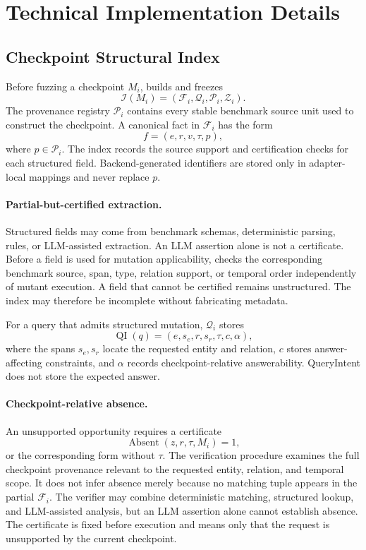 \section{Technical Implementation Details}
\label{app:tech}

\subsection{Checkpoint Structural Index}
\label{app:structural-index}

Before fuzzing a checkpoint \(M_i\), \system builds and freezes
\[
\mathcal{I}(M_i)=(\mathcal{F}_i,\mathcal{Q}_i,
\mathcal{P}_i,\mathcal{Z}_i).
\]
The provenance registry \(\mathcal{P}_i\) contains every stable benchmark
source unit used to construct the checkpoint. A canonical fact in
\(\mathcal{F}_i\) has the form
\[
f=(e,r,v,\tau,p),
\]
where \(p\in\mathcal{P}_i\). The index records the source support and
certification checks for each structured field. Backend-generated identifiers
are stored only in adapter-local mappings and never replace \(p\).

\paragraph{Partial-but-certified extraction.}
Structured fields may come from benchmark schemas, deterministic parsing,
rules, or LLM-assisted extraction. An LLM assertion alone is not a
certificate. Before a field is used for mutation applicability, \system
checks the corresponding benchmark source, span, type, relation support, or
temporal order independently of mutant execution. A field that cannot be
certified remains unstructured. The index may therefore be incomplete without
fabricating metadata.

For a query that admits structured mutation, \(\mathcal{Q}_i\) stores
\[
\operatorname{QI}(q)=(e,s_e,r,s_r,\tau,c,\alpha),
\]
where the spans \(s_e,s_r\) locate the requested entity and relation, \(c\)
stores answer-affecting constraints, and \(\alpha\) records
checkpoint-relative answerability. QueryIntent does not store the expected
answer.

\paragraph{Checkpoint-relative absence.}
An unsupported opportunity requires a certificate
\[
\operatorname{Absent}(z,r,\tau,M_i)=1,
\]
or the corresponding form without \(\tau\). The verification procedure
examines the full checkpoint provenance relevant to the requested entity,
relation, and temporal scope. It does not infer absence merely because no
matching tuple appears in the partial \(\mathcal{F}_i\). The verifier may
combine deterministic matching, structured lookup, and LLM-assisted analysis,
but an LLM assertion alone cannot establish absence. The certificate is fixed
before execution and means only that the request is unsupported by the current
checkpoint.


